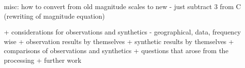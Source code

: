 \documentclass{gji}
\begin{document}
misc:
how to convert from old magnitude scales to new - just subtract 3 from C (rewriting of magnitude equation)

+ considerations for observations and synthetics - geographical, data, frequency wise
+ observation results by themselves
+ synthetic results by themselves
+ comparisons of observations and synthetics
+ questions that arose from the processing
+ further work


%
%
%
\end{document}
